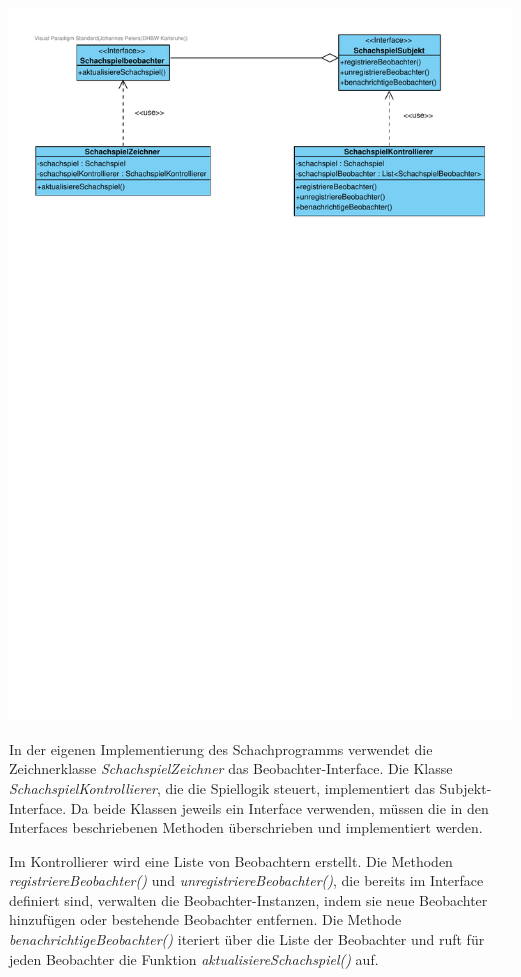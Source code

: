 \begin{minipage}{\linewidth}
    \centering
    \includegraphics[scale=0.75, trim={0 20cm 0 0}]{Bilder/SWE_mit_Observer.pdf}
\end{minipage}

In der eigenen Implementierung des Schachprogramms verwendet die Zeichnerklasse \textit{SchachspielZeichner} das Beobachter-Interface. 
Die Klasse \textit{SchachspielKontrollierer}, die die Spiellogik steuert, implementiert das Subjekt-Interface. 
Da beide Klassen jeweils ein Interface verwenden, müssen die in den Interfaces beschriebenen Methoden überschrieben und implementiert werden.

Im Kontrollierer wird eine Liste von Beobachtern erstellt. 
Die Methoden \textit{registriereBeobachter()} und \textit{unregistriereBeobachter()}, die bereits im Interface definiert sind, verwalten die Beobachter-Instanzen, indem sie neue Beobachter hinzufügen oder bestehende Beobachter entfernen. 
Die Methode \textit{benachrichtigeBeobachter()} iteriert über die Liste der Beobachter und ruft für jeden Beobachter die Funktion \textit{aktualisiereSchachspiel()} auf.

